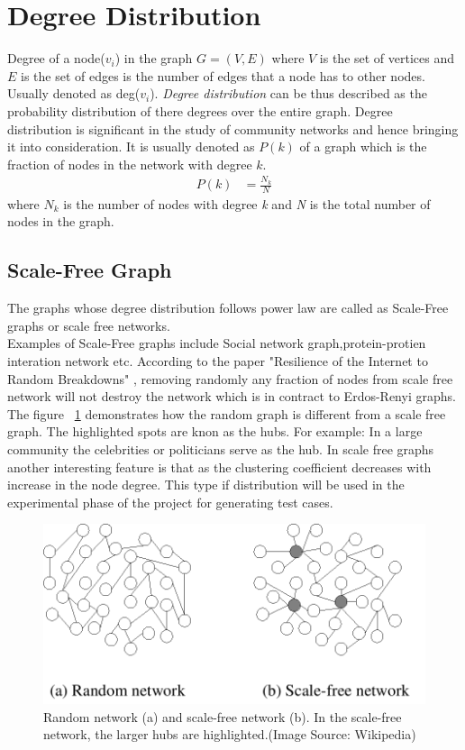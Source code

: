 \section{Degree Distribution}
Degree of a node($v_i$) in the graph $G = (V,E)$ where $V$ is the set of vertices and $E$ is the set of edges is the number of edges that a  node has to other nodes. Usually denoted as deg($v_i$). \textit{Degree distribution} can be thus described as the probability distribution of there degrees over the entire graph.  Degree distribution is significant in the study of community networks and hence bringing it into consideration.  It is usually denoted as $P(k)$ of a graph which is the fraction of nodes in the network with degree $k$.
\begin{equation}
\begin{split}
P(k) &= \frac{N_k}{N}
\end{split}
\end{equation}
where $N_k$ is the number of  nodes with degree \textit{k} and \textit{N} is the total number of nodes in the graph.
\subsection{Scale-Free Graph}
The graphs whose degree distribution follows power law are called as Scale-Free graphs or scale free networks. 
\\
Examples of Scale-Free graphs include Social network graph,protein-protien interation network etc. 
According to the paper "Resilience of the Internet to Random Breakdowns" \cite{scalefree}, removing randomly any fraction of nodes from scale free network will not destroy the network which is in contract to Erdos-Renyi graphs. The figure ~\ref{ranfig} demonstrates how the random graph is different from a scale free graph.  The highlighted spots are knon as the hubs. For example: In a large community the celebrities or politicians serve as the hub. In scale free graphs another interesting feature is that as the clustering coefficient decreases with increase in the node degree. This type if distribution will be used in the experimental phase of the project for generating test cases. 

\begin{figure}[H]
\centering
\includegraphics[scale=0.4]{sclaran.png}
\caption{ \label{ranfig} Random network (a) and scale-free network (b). In the scale-free network, the larger hubs are highlighted.(Image Source: Wikipedia)}
\end{figure}

